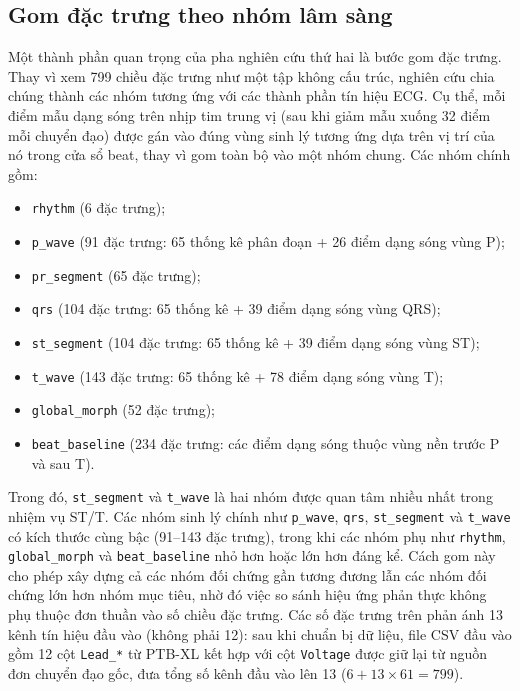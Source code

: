 \blocksep

\subsection{Gom đặc trưng theo nhóm lâm sàng}

\blocksep

Một thành phần quan trọng của pha nghiên cứu thứ hai là bước gom đặc trưng. Thay vì xem 799 chiều đặc trưng như một tập không cấu trúc, nghiên cứu chia chúng thành các nhóm tương ứng với các thành phần tín hiệu ECG. Cụ thể, mỗi điểm mẫu dạng sóng trên nhịp tim trung vị (sau khi giảm mẫu xuống 32 điểm mỗi chuyển đạo) được gán vào đúng vùng sinh lý tương ứng dựa trên vị trí của nó trong cửa sổ beat, thay vì gom toàn bộ vào một nhóm chung. Các nhóm chính gồm:

\renewcommand{\labelitemi}{$+$}
\begin{itemize}
	\item \texttt{rhythm} (6 đặc trưng);
	\item \texttt{p\_wave} (91 đặc trưng: 65 thống kê phân đoạn + 26 điểm dạng sóng vùng P);
	\item \texttt{pr\_segment} (65 đặc trưng);
	\item \texttt{qrs} (104 đặc trưng: 65 thống kê + 39 điểm dạng sóng vùng QRS);
	\item \texttt{st\_segment} (104 đặc trưng: 65 thống kê + 39 điểm dạng sóng vùng ST);
	\item \texttt{t\_wave} (143 đặc trưng: 65 thống kê + 78 điểm dạng sóng vùng T);
	\item \texttt{global\_morph} (52 đặc trưng);
	\item \texttt{beat\_baseline} (234 đặc trưng: các điểm dạng sóng thuộc vùng nền trước P và sau T).
\end{itemize}

\blocksep

Trong đó, \texttt{st\_segment} và \texttt{t\_wave} là hai nhóm được quan tâm nhiều nhất trong nhiệm vụ ST/T. Các nhóm sinh lý chính như \texttt{p\_wave}, \texttt{qrs}, \texttt{st\_segment} và \texttt{t\_wave} có kích thước cùng bậc (91--143 đặc trưng), trong khi các nhóm phụ như \texttt{rhythm}, \texttt{global\_morph} và \texttt{beat\_baseline} nhỏ hơn hoặc lớn hơn đáng kể. Cách gom này cho phép xây dựng cả các nhóm đối chứng gần tương đương lẫn các nhóm đối chứng lớn hơn nhóm mục tiêu, nhờ đó việc so sánh hiệu ứng phản thực không phụ thuộc đơn thuần vào số chiều đặc trưng. Các số đặc trưng trên phản ánh 13 kênh tín hiệu đầu vào (không phải 12): sau khi chuẩn bị dữ liệu, file CSV đầu vào gồm 12 cột \texttt{Lead\_*} từ PTB-XL kết hợp với cột \texttt{Voltage} được giữ lại từ nguồn đơn chuyển đạo gốc, đưa tổng số kênh đầu vào lên 13 ($6 + 13 \times 61 = 799$).

